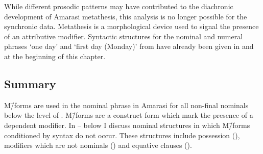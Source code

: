 While different prosodic patterns may have contributed
to the diachronic development of Amarasi metathesis,
this analysis is no longer possible for the synchronic data.
Metathesis is a morphological device used
to signal the presence of an attributive modifier.
Syntactic structures for the nominal and numeral phrases
 `one day' and  `first day (Monday)' from 
have already been given in  and 
at the beginning of this chapter.

%

\subsection{Summary}
M\=/forms are used in the nominal phrase in Amarasi for all non-final
nominals below the level of .
M\=/forms are a construct form which mark the presence of a dependent modifier.
In -- below
I discuss nominal structures in
which M\=/forms conditioned by syntax do not occur.
These structures include possession (),
modifiers which are not nominals ()
and equative clauses ().
